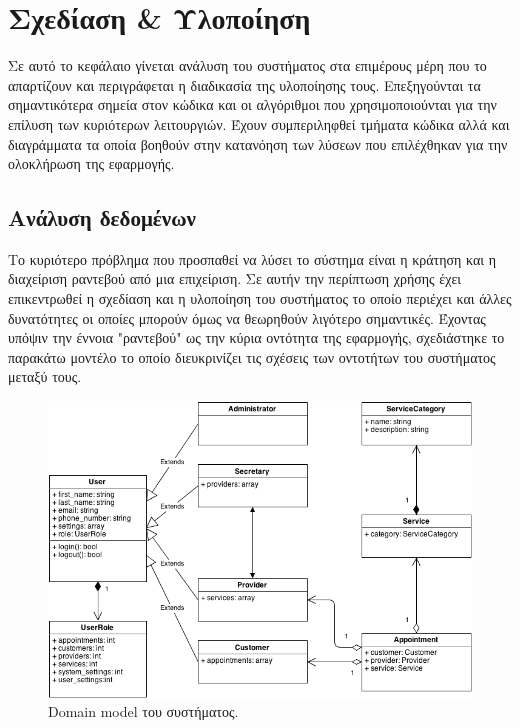 
\chapter{Σχεδίαση \& Υλοποίηση}
Σε αυτό το κεφάλαιο γίνεται ανάλυση του συστήματος στα επιμέρους μέρη που το απαρτίζουν και περιγράφεται η διαδικασία της υλοποίησης τους. Επεξηγούνται τα σημαντικότερα σημεία στον κώδικα και οι αλγόριθμοι που χρησιμοποιούνται για την επίλυση των κυριότερων λειτουργιών. Έχουν συμπεριληφθεί τμήματα κώδικα αλλά και διαγράμματα τα οποία βοηθούν στην κατανόηση των λύσεων που επιλέχθηκαν για την ολοκλήρωση της εφαρμογής.

\section{Ανάλυση δεδομένων}
Το κυριότερο πρόβλημα που προσπαθεί να λύσει το σύστημα είναι η κράτηση και η διαχείριση ραντεβού από μια επιχείριση. Σε αυτήν την περίπτωση χρήσης έχει επικεντρωθεί η σχεδίαση και η υλοποίηση του συστήματος το οποίο περιέχει και άλλες δυνατότητες οι οποίες μπορούν όμως να θεωρηθούν λιγότερο σημαντικές. Έχοντας υπόψιν την έννοια "ραντεβού" ως την κύρια οντότητα της εφαρμογής, σχεδιάστηκε το παρακάτω μοντέλο το οποίο διευκρινίζει τις σχέσεις των οντοτήτων του συστήματος μεταξύ τους.

\begin{figure}[ht!]
\centering
\includegraphics[width=160mm]{images/domain-model.png}
\caption{Domain model του συστήματος.}
\label{domain-model}
\end{figure}

